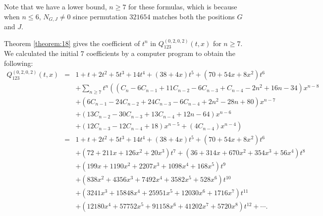 \documentclass[
final,nomarks
]{dmtcs-episciences}
\newcommand{\tref}[1]{Theorem \ref{theorem:#1}}
\newcommand{\Qm}[1]{Q_{123}^{(#1)}(t,x)}
\begin{document}
Note that we have a lower bound, \begin{math}n\geq 7\end{math} for these formulas, which is because when \begin{math}n\leq 6\end{math}, \begin{math}N_{G,J}\neq 0\end{math} since permutation \begin{math}321654\end{math} matches both the positions \begin{math}G\end{math} and \begin{math}J\end{math}.

\tref{18} gives the coefficient of \begin{math}t^n\end{math} in \begin{math}\Qm{0,2,0,2}\end{math} for \begin{math}n\geq 7\end{math}. We calculated the initial \begin{math}7\end{math} coefficients by a computer program to obtain the following:
\begin{eqnarray}
	\Qm{0,2,0,2}&=&1+t+2t^2+5t^3+14t^4+(38+4x)t^5+(70+54x+8x^2)t^6\nonumber\\\nonumber
	&&+\sum_{n\geq 7}t^n\left(
	(C_n-6C_{n-1}+11C_{n-2}-6C_{n-3}+C_{n-4}-2n^2+16n-34)x^{n-8}\right.\\\nonumber
	&&+(6C_{n-1}-24C_{n-2}+24C_{n-3}-6C_{n-4}+2n^2-28n+80)x^{n-7}\\\nonumber
	&&+(13C_{n-2}-30C_{n-3}+13C_{n-4}+12n-64)x^{n-6}\\\nonumber
	&&\left.+(12C_{n-3}-12C_{n-4}+18)x^{n-5}
	+(4C_{n-4})x^{n-4}
	\right)\\\nonumber
	&=&1+t+2 t^2+5 t^3+14 t^4+(38+4 x) t^5+\left(70+54x+8 x^2\right)
	t^6\\\nonumber
	&&+\left(72+211 x+126 x^2+20 x^3\right) t^7+\left(36+314 x+670 x^2+354
	x^3+56 x^4\right) t^8\\\nonumber
	&&+\left(199 x+1190 x^2+2207 x^3+1098 x^4+168 x^5\right)
	t^9\\\nonumber
	&&+\left(838 x^2+4356 x^3+7492 x^4+3582 x^5+528 x^6\right)
	t^{10}\\\nonumber
	&&+\left(3241 x^3+15848 x^4+25951 x^5+12030 x^6+1716 x^7\right)
	t^{11}\\
	&&+\left(12180 x^4+57752 x^5+91158 x^6+41202 x^7+5720 x^8\right)
	t^{12}+\cdots .
\end{eqnarray}  


\nocite{*}

%

\label{sec:biblio}
\end{document}
